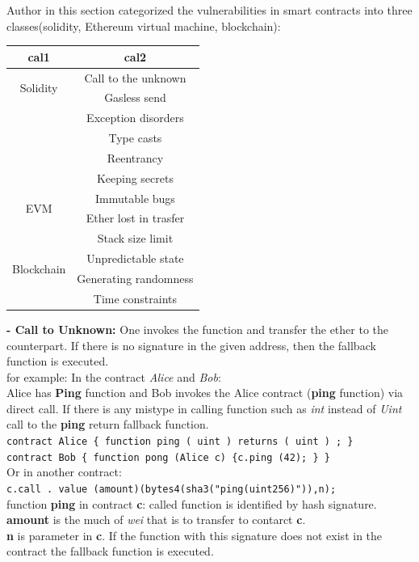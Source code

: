 Author in this section categorized the vulnerabilities in smart contracts into three classes(solidity, Ethereum virtual machine, blockchain):\\
\begin{center}
   \begin{tabular}{c |c }
   	\hline
   	    cal1 & cal2 \\
   	\hline
   	  \multirow{2}{4em}{Solidity} & Call to the unknown \\ & Gasless send \\ & Exception disorders  \\ & Type casts \\ & Reentrancy \\ & Keeping secrets \\
   	\hline 
   	  \multirow{2}{4em}{EVM}& Immutable bugs \\ & Ether lost in trasfer \\ & Stack size limit \\
   	\hline  
   	 \multirow{2}{4em}{Blockchain} & Unpredictable state \\ & Generating randomness \\ & Time constraints \\
   	\hline
   \end{tabular}	 
 
\end{center}
\textbf{- Call to Unknown:} One invokes the function and transfer the ether to the counterpart. If there is no signature in the given address, then the fallback function is executed.\\ 
for example: In the contract \textit{Alice} and  \textit{Bob}:\\
 Alice has \textbf
{Ping} function and Bob invokes the Alice contract (\textbf{ping} function) via direct call. If there is any mistype in calling function such as \textit{int} instead of \textit{Uint} call to the \textbf{ping} return fallback function. \\

\texttt{\color{red}contract \color{black}Alice \{ \color{red}function \color{black}ping (\color{red} uint \color{black}) \color{red}returns \color{black}( \color{red}uint \color{black}) ; \} }\\
\texttt{\color{red}contract \color{black}Bob
	\{ \color{red}function \color{black}pong (Alice c) \{c.ping (42); \} \}}
\\
Or in another contract: \\
\texttt{c.\color{red}call . value \color{black}(amount)(bytes4(sha3("ping(uint256)")),n); }\\
function \textbf{ping} in contract \textbf{c}: called function is identified by hash signature.\\
\textbf{amount } is the much of \textit{wei} that is to transfer to contarct \textbf{c}.\\
\textbf{n}  is parameter in \textbf{ c}. If the function with this signature does not exist in the contract the fallback function is executed.  
\\

